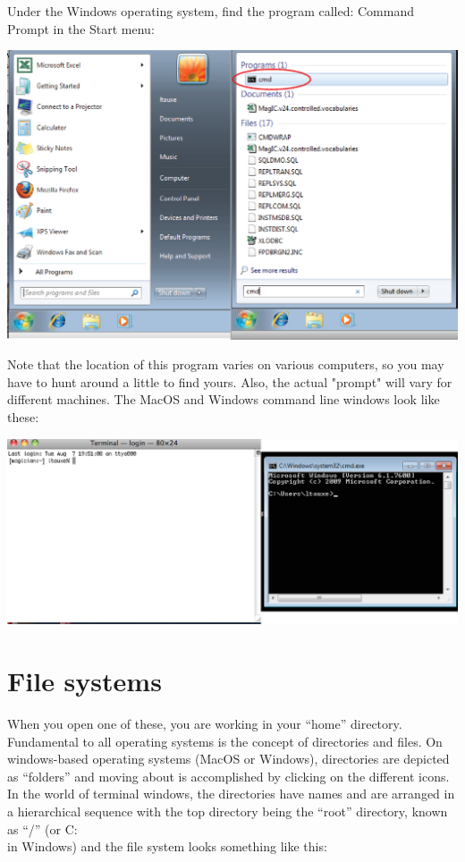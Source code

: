 \documentclass[11pt]{book}
\begin{document}
Under the Windows operating system, find the program called: Command Prompt in the Start menu:

  \includegraphics[width=15 cm]{EPSfiles/cmd.eps}
  
  Note that the location of this program varies on various computers, so you may have to hunt around a little to find yours. Also, the actual "prompt" will vary for different machines. The MacOS and Windows command line windows look like these:
  
    \includegraphics[width=15 cm]{EPSfiles/terminals.eps}
    

  
  
\section{File systems}
\label{sect:file_systems}
    When you open one of these,  you are working in your  ``home'' directory.   
Fundamental to all  operating systems is the concept of
directories and files.  On windows-based operating systems (MacOS or Windows), directories are depicted
as ``folders'' and moving about is accomplished by clicking on the different icons.
In the world of terminal windows, the directories have names and are arranged in a hierarchical sequence with
the top directory being the ``root'' directory, known as  ``/'' (or C:\\ in Windows) and the file system looks something like this:
\end{document}
